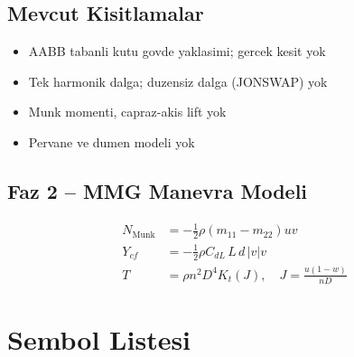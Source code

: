 \documentclass[12pt,a4paper]{article}
\begin{document}
\subsection{Mevcut Kisitlamalar}

\begin{itemize}
  \item AABB tabanli kutu govde yaklasimi; gercek kesit yok
  \item Tek harmonik dalga; duzensiz dalga (JONSWAP) yok
  \item Munk momenti, capraz-akis lift yok
  \item Pervane ve dumen modeli yok
\end{itemize}

\subsection{Faz 2 -- MMG Manevra Modeli}

\begin{align}
  N_{\text{Munk}} &= -\tfrac{1}{2}\rho(m_{11}-m_{22})uv \label{eq:munk} \\
  Y_{cf} &= -\tfrac{1}{2}\rho C_{dL}\,L\,d\,|v|v \label{eq:crossflow} \\
  T &= \rho n^2 D^4 K_t(J),\quad J = \frac{u(1-w)}{nD} \label{eq:propeller}
\end{align}

\appendix
\section{Sembol Listesi}
\end{document}
